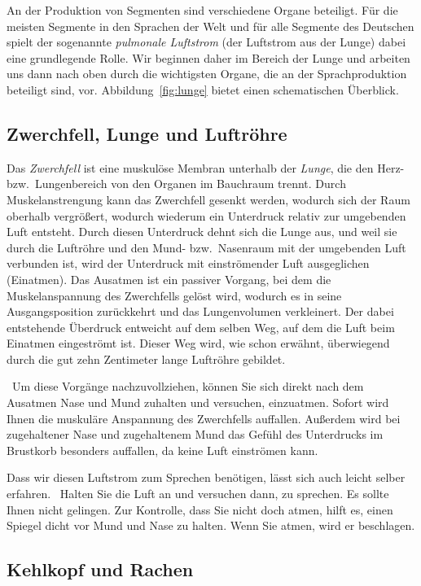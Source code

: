 An der Produktion von Segmenten sind verschiedene Organe beteiligt.
Für die meisten Segmente in den Sprachen der Welt und für alle Segmente des Deutschen spielt der sogenannte \textit{pulmonale Luftstrom} (der Luftstrom aus der Lunge) dabei eine grundlegende Rolle.
Wir beginnen daher im Bereich der Lunge und arbeiten uns dann nach oben durch die wichtigsten Organe, die an der Sprachproduktion beteiligt sind, vor.
Abbildung~\ref{fig:lunge} bietet einen schematischen Überblick.

\subsection{Zwerchfell, Lunge und Luftröhre}

Das \textit{Zwerchfell} ist eine muskulöse Membran unterhalb der \textit{Lunge}, die den Herz- bzw.\ Lungenbereich von den Organen im Bauchraum trennt.
Durch Muskelanstrengung kann das Zwerchfell gesenkt werden, wodurch sich der Raum oberhalb vergrößert, wodurch wiederum ein Unterdruck relativ zur umgebenden Luft entsteht.
Durch diesen Unterdruck dehnt sich die Lunge aus, und weil sie durch die Luftröhre und den Mund- bzw.\ Nasenraum mit der umgebenden Luft verbunden ist, wird der Unterdruck mit einströmender Luft ausgeglichen (Einatmen).
Das Ausatmen ist ein passiver Vorgang, bei dem die Muskelanspannung des Zwerchfells gelöst wird, wodurch es in seine Ausgangsposition zurückkehrt und das Lungenvolumen verkleinert.
Der dabei entstehende Überdruck entweicht auf dem selben Weg, auf dem die Luft beim Einatmen eingeströmt ist.
Dieser Weg wird, wie schon erwähnt, überwiegend durch die gut zehn Zentimeter lange Luftröhre gebildet.

\TuBegin~Um diese Vorgänge nachzuvollziehen, können Sie sich direkt nach dem Ausatmen Nase und Mund zuhalten und versuchen, einzuatmen.
Sofort wird Ihnen die muskuläre Anspannung des Zwerchfells auffallen.
Außerdem wird bei zugehaltener Nase und zugehaltenem Mund das Gefühl des Unterdrucks im Brustkorb besonders auffallen, da keine Luft einströmen kann.

Dass wir diesen Luftstrom zum Sprechen benötigen, lässt sich auch leicht selber erfahren.
\TuBegin~Halten Sie die Luft an und versuchen dann, zu sprechen.
Es sollte Ihnen nicht gelingen.
Zur Kontrolle, dass Sie nicht doch atmen, hilft es, einen Spiegel dicht vor Mund und Nase zu halten.
Wenn Sie atmen, wird er beschlagen.

\subsection{Kehlkopf und Rachen}

